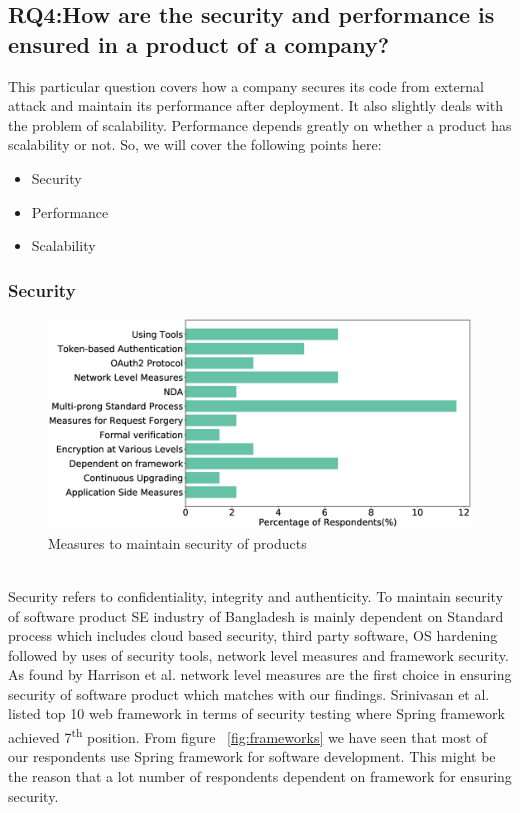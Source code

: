 \subsection{RQ4:How are the security and performance is ensured in
a product of a company?}
\label{RQ4}
This particular question covers how a company secures its code from external attack and maintain its performance after deployment. It also slightly deals with the problem of scalability. Performance depends greatly on whether a product has scalability or not. So, we will cover the following points here:
\begin{itemize}
    \item Security
    \item Performance
    \item Scalability
\end{itemize}
\subsubsection{Security}
\label{Security}
\begin{figure}[htbp]
\includegraphics[scale=0.28]{Figures/Security.eps} 
\caption{Measures to maintain security of products}
\label{fig:Measures to ensure security}
\end{figure}
\hfill\\
Security refers to confidentiality, integrity and authenticity. To maintain security of software product SE industry of Bangladesh is mainly dependent on Standard process which includes cloud based security, third party software, OS hardening followed by uses of security tools, network level measures and framework security. As found by Harrison et al.\cite{Harrison2010} network level measures are the first choice in ensuring security of software product which matches with our findings. Srinivasan et al.\cite{Srinivasan2017} listed top 10 web framework in terms of security testing where Spring framework achieved 7\textsuperscript{th} position. From figure ~\ref{fig:frameworks} we have seen that most of our respondents use Spring framework for software development. This might be the reason that a lot number of respondents dependent on framework for ensuring security.
